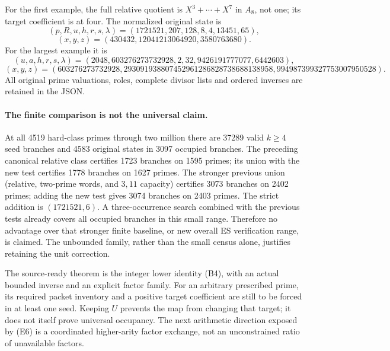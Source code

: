 For the first example, the full relative quotient is
$X^3+\cdots+X^7$ in $A_8$, not one; its target coefficient is at four.
The normalized original state is
\[
 (p,R,u,h,r,s,\lambda)=(1721521,207,128,8,4,13451,65),
\]
\[
 (x,y,z)=(430432,12041213064920,3580763680).
\]
For the largest example it is
\[
 (u,a,h,r,s,\lambda)=(2048,603276273732928,2,32,9426191777077,6442603),
\]
\[
 (x,y,z)=(603276273732928,
 293091938807452961286828738688138958,
 994987399327753007950528).
\]
All original prime valuations, roles, complete divisor lists and ordered
inverses are retained in the JSON.

\paragraph{The finite comparison is not the universal claim.}
At all 4519 hard-class primes through two million there are 37289 valid
$k\ge4$ seed branches and 4583 original states in 3097 occupied branches.
The preceding canonical relative class certifies 1723 branches on 1595 primes;
its union with the new test certifies 1778 branches on 1627 primes.
The stronger previous union (relative, two-prime words, and $3,11$ capacity)
certifies 3073 branches on 2402 primes; adding the new test gives 3074 branches
on 2403 primes. The strict addition is $(1721521,6)$. A three-occurrence search
combined with the previous tests already covers all occupied branches in this
small range. Therefore no advantage over that stronger finite baseline, or new
overall ES verification range, is claimed. The unbounded family, rather than
the small census alone, justifies retaining the unit correction.

The source-ready theorem is the integer lower identity (B4), with an actual
bounded inverse and an explicit factor family. For an arbitrary prescribed
prime, its required packet inventory and a positive target coefficient are
still to be forced in at least one seed. Keeping $U$ prevents the map from
changing that target; it does not itself prove universal occupancy.
The next arithmetic direction exposed by (E6) is a coordinated higher-arity
factor exchange, not an unconstrained ratio of unavailable factors.
